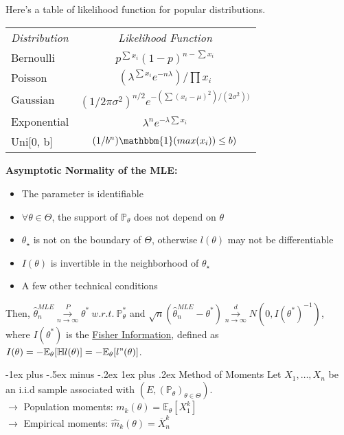\documentclass[9pt,landscape]{article}
\makeatletter
\renewcommand{\subsubsection}{\@startsection{subsubsection}{3}{0mm}%
                                {-1ex plus -.5ex minus -.2ex}%
                                {1ex plus .2ex}%
                                {\normalfont\small\bfseries}}
\makeatother
\begin{document}
\begin{multicols}{3}
Here's a table  of likelihood function for popular distributions.\\

\begin{tabular}{l c}
    \textit{Distribution} &\textit{Likelihood Function}\\
    Bernoulli & $p^{\sum x_i} (1-p)^{n- \sum x_i}$\\
    Poisson & $(\lambda^{\sum x_i} e^{-n\lambda})/ \prod x_i$\\
    Gaussian & $(1/2 \pi \sigma^2)^{n/2} e^{-(\sum(x_i - \mu)^2)/(2\sigma^2))}$\\
    Exponential & $\lambda^n e^{-\lambda \sum x_i}$\\
    Uni[0, b] & $(1/b^n) \mathbbm{1}(max(x_i)) \leq b)$
\end{tabular}
\newline

\textbf{Asymptotic Normality of the MLE:} 
\begin{itemize}
    \item The parameter is identifiable
    \item $\forall \theta \in \Theta$, the support of $\mathbb{P}_\theta$ does not depend on $\theta$
    \item $\theta_\star$ is not on the boundary of $\Theta$, otherwise $l(\theta)$ may not be differentiable
    \item $I(\theta)$ is invertible in the neighborhood of $\theta_\star$
    \item A few other technical conditions
\end{itemize}

Then, $\widehat{\theta}^{MLE}_{n} \overset{P}{\underset{n \to \infty}{\to}} \theta^* \ w.r.t. \ \mathbb{P}_\theta^{*}$ and  
$\sqrt{n}(\widehat{\theta}^{MLE}_n - \theta^*) \overset{d}{\underset{n\to \infty}{\to}} N(0, I(\theta^*)^{-1})$, 
where $I(\theta^*)$ is the \underline{Fisher Information}, defined as $I(\theta) = -\mathbb{E}_\theta[\mathbb{H}l(\theta)] = -\mathbb{E}_\theta[l"(\theta)]$.

\subsubsection{Method of Moments}
Let $X_1, \dots, X_n$ be an i.i.d sample associated with $(E, (\mathbb{P}_\theta)_{\theta \in \Theta})$.\\
$\longrightarrow$ Population moments: $m_k(\theta) = \mathbb{E}_\theta [X_1^k]$\\
$\longrightarrow$ Empirical moments: $ \widehat{m}_k (\theta) = \overline{X}_n^k$\\


\end{multicols}
\end{document}
